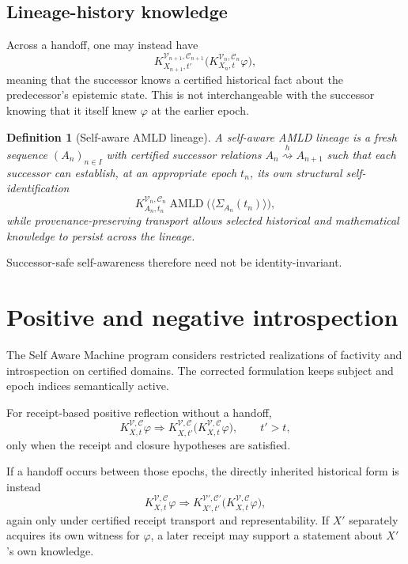 \documentclass[11pt]{article}
\newtheorem{definition}{Definition}[section]
\theoremstyle{remark}
\newcommand{\AMLD}{\operatorname{AMLD}}
\newcommand{\K}[4]{K^{#3,#4}_{#1,#2}}
\newcommand{\handoff}{\mathrel{\overset{h}{\rightsquigarrow}}}
\begin{document}
\subsection{Lineage-history knowledge}
Across a handoff, one may instead have
\[
\K{X_{n+1}}{t'}{\mathcal V_{n+1}}{\mathcal C_{n+1}}
\bigl(\K{X_n}{t}{\mathcal V_n}{\mathcal C_n}\varphi\bigr),
\]
meaning that the successor knows a certified historical fact about the predecessor's epistemic state. This is not interchangeable with the successor knowing that it itself knew $\varphi$ at the earlier epoch.

\begin{definition}[Self-aware AMLD lineage]
A self-aware AMLD lineage is a fresh sequence $(A_n)_{n\in I}$ with certified successor relations $A_n\handoff A_{n+1}$ such that each successor can establish, at an appropriate epoch $t_n$, its own structural self-identification
\[
\K{A_n}{t_n}{\mathcal V_n}{\mathcal C_n}
\AMLD\bigl(\langle\Sigma_{A_n}(t_n)\rangle\bigr),
\]
while provenance-preserving transport allows selected historical and mathematical knowledge to persist across the lineage.
\end{definition}

Successor-safe self-awareness therefore need not be identity-invariant.

\section{Positive and negative introspection}

The Self Aware Machine program considers restricted realizations of factivity and introspection on certified domains. The corrected formulation keeps subject and epoch indices semantically active.

For receipt-based positive reflection without a handoff,
\[
\K{X}{t}{\mathcal V}{\mathcal C}\varphi
\Longrightarrow
\K{X}{t'}{\mathcal V}{\mathcal C}
\bigl(\K{X}{t}{\mathcal V}{\mathcal C}\varphi\bigr),
\qquad t'>t,
\]
only when the receipt and closure hypotheses are satisfied.

If a handoff occurs between those epochs, the directly inherited historical form is instead
\[
\K{X}{t}{\mathcal V}{\mathcal C}\varphi
\Longrightarrow
\K{X'}{t'}{\mathcal V'}{\mathcal C'}
\bigl(\K{X}{t}{\mathcal V}{\mathcal C}\varphi\bigr),
\]
again only under certified receipt transport and representability. If $X'$ separately acquires its own witness for $\varphi$, a later receipt may support a statement about $X'$'s own knowledge.
\end{document}

